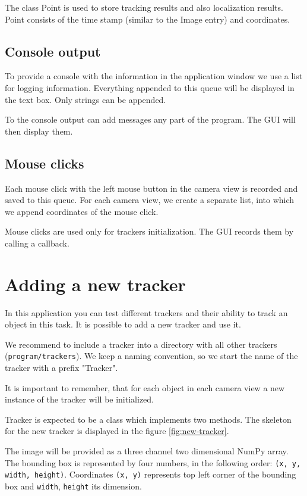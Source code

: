 The class Point is used to store tracking results and also localization
results. Point consists of the time stamp (similar to the Image entry) and
coordinates.

\subsection*{Console output}

To provide a console with the information in the application window we use a
list for logging information. Everything appended to this queue will be
displayed in the text box. Only strings can be appended.

To the console output can add messages any part of the program. The GUI will
then display them.

\subsection*{Mouse clicks}

Each mouse click with the left mouse button in the camera view is recorded and
saved to this queue. For each camera view, we create a separate list, into
which we append coordinates of the mouse click.

Mouse clicks are used only for trackers initialization. The GUI records them by
calling a callback.

\section{Adding a new tracker} 

In this application you can test different
trackers and their ability to track an object in this task. It is possible to
add a new tracker and use it.

We recommend to include a tracker into a directory with all other trackers
(\verb+program/trackers+). We keep a naming convention, so we start the name of
the tracker with a prefix "Tracker".

It is important to remember, that for each object in each camera view a new
instance of the tracker will be initialized.

Tracker is expected to be a class which implements two methods. The skeleton
for the new tracker is displayed in the figure \ref{fig:new-tracker}.

The image will be provided as a three channel two dimensional NumPy array. The
bounding box is represented by four numbers, in the following order: \verb+(x, y, width, height)+.
Coordinates \verb+(x, y)+ represents top left corner of
the bounding box and \verb+width+, \verb+height+ its dimension.

